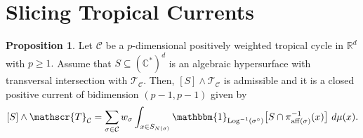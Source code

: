 \documentclass[11pt]{amsart}
\def\Log{{\rm Log}}
\theoremstyle{definition}
\newtheorem{proposition}[theorem]{Proposition}
\newcommand{\R}{\mathbb{R}}
\newcommand{\C}{\mathbb{C}}
\newcommand{\cC}{\mathcal{C}}
\newcommand{\sT}{\mathscr{T}}
\begin{document}

\section{Slicing Tropical Currents}
\begin{proposition} \label{prop:slice}
Let $\cC$ be a $p$-dimensional positively weighted tropical cycle in $\R^d$ with $p\geq 1.$ Assume that  $S\subseteq (\C^*)^d$ is an algebraic hypersurface with transversal intersection with $\sT_{\cC}.$ Then, $[S] \wedge \sT_{\cC} $ is admissible and it is a closed positive current of bidimension $(p-1,p-1)$ given by
$$
[S] \wedge \sT_{\cC} = \sum_{\sigma \in \cC} w_{\sigma}\int_{x \in S_{N(\sigma)}} \mathbbm{1}_{\Log^{-1}(\sigma^{\circ})} \big[ S \cap \pi_{\mathrm{aff}(\sigma)}^{-1}(x) \big] \ d\mu(x).
$$
\end{proposition}
\end{document}
